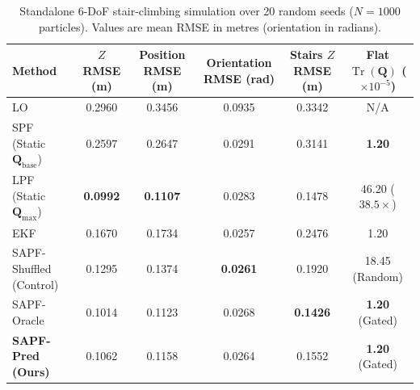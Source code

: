 \documentclass[11pt, a4paper]{article}
\begin{document}
\begin{table}[htbp]
    \centering
    \caption{Standalone 6-DoF stair-climbing simulation over 20 random seeds ($N=1000$ particles). Values are mean RMSE in metres (orientation in radians).}
    \label{tab:standalone_sapf}
    \footnotesize
    \setlength{\tabcolsep}{3.5pt}
    \begin{tabularx}{\textwidth}{>{\raggedright\arraybackslash}X ccccc}
        \toprule
        \textbf{Method} & \textbf{$Z$ RMSE (m)} & \textbf{Position RMSE (m)} & \textbf{Orientation RMSE (rad)} & \textbf{Stairs $Z$ RMSE (m)} & \textbf{Flat $\operatorname{Tr}(\mathbf{Q})$ ($\times 10^{-5}$)} \\
        \midrule
        LO & 0.2960 & 0.3456 & 0.0935 & 0.3342 & N/A \\
        SPF (Static $\mathbf{Q}_{\text{base}}$) & 0.2597 & 0.2647 & 0.0291 & 0.3141 & \textbf{1.20} \\
        LPF (Static $\mathbf{Q}_{\max}$) & \textbf{0.0992} & \textbf{0.1107} & 0.0283 & 0.1478 & 46.20 ($38.5\times$) \\
        EKF & 0.1670 & 0.1734 & 0.0257 & 0.2476 & 1.20 \\
        SAPF-Shuffled (Control) & 0.1295 & 0.1374 & \textbf{0.0261} & 0.1920 & 18.45 (Random) \\
        SAPF-Oracle & 0.1014 & 0.1123 & 0.0268 & \textbf{0.1426} & \textbf{1.20} (Gated) \\
        \textbf{SAPF-Pred (Ours)} & 0.1062 & 0.1158 & 0.0264 & 0.1552 & \textbf{1.20} (Gated) \\
        \bottomrule
    \end{tabularx}
\end{table}
\end{document}
